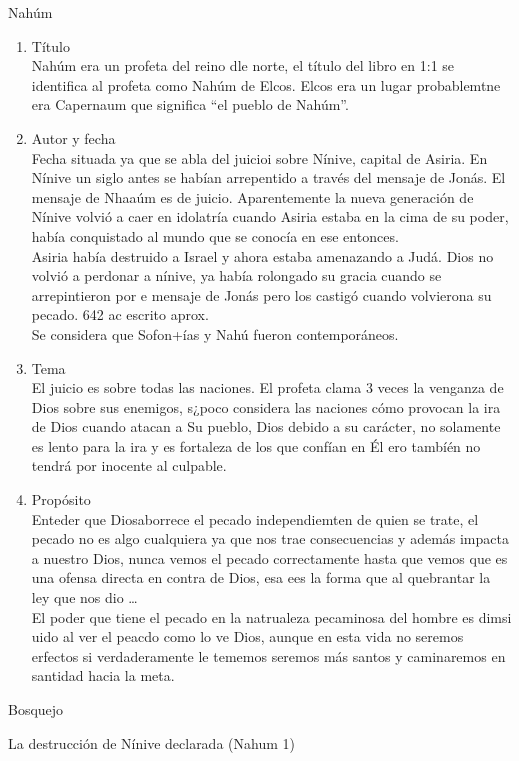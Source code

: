 \documentclass[12pt]{article}
\begin{document}
\begin{section}{Nahúm}
	\begin{enumerate}
		\item Título\\
			Nahúm era un profeta del reino dle norte, el título del libro en 1:1 se identifica al profeta como Nahúm de Elcos. Elcos era un lugar probablemtne era Capernaum que significa ``el pueblo de Nahúm''.
		\item Autor y fecha\\
			Fecha situada ya que se abla del juicioi sobre Nínive, capital de Asiria. En Nínive un siglo antes se habían arrepentido a través del mensaje de Jonás. El mensaje de Nhaaúm es de juicio. Aparentemente la nueva generación de Nínive volvió a caer en idolatría cuando Asiria estaba en la cima de su poder, había conquistado al mundo que se conocía en ese entonces.\\
			Asiria había destruido a Israel y ahora estaba amenazando a Judá. Dios no volvió a perdonar a nínive, ya había rolongado su gracia cuando se arrepintieron por e  mensaje de Jonás pero los castigó cuando volvierona  su pecado. 642 ac escrito aprox.\\
			Se considera que Sofon+ías y Nahú fueron contemporáneos.
		\item Tema\\ 
			El juicio es sobre todas las naciones. El profeta clama 3 veces la venganza de Dios sobre sus enemigos, s¿poco considera las naciones cómo provocan la ira de Dios cuando atacan a Su pueblo, Dios debido a su carácter, no solamente es lento para la ira y es fortaleza de los que confían en Él ero tambíén no tendrá por inocente al culpable. 
		\item Propósito\\
			Enteder que Diosaborrece el pecado independiemten de quien se trate, el pecado no es algo cualquiera ya que nos trae consecuencias y además impacta a nuestro Dios, nunca vemos el pecado correctamente hasta que vemos que es una ofensa directa en contra de Dios, esa ees la forma que al quebrantar la ley que nos dio \ldots \\
			El poder que tiene el pecado en la natrualeza pecaminosa del hombre es dimsi uido al ver el peacdo como lo ve Dios, aunque en esta vida no seremos erfectos si verdaderamente le tememos seremos más santos y caminaremos en santidad hacia la meta.
	\end{enumerate}
	\begin{subsection}{Bosquejo}
		\begin{subsubsection}{La destrucción de Nínive declarada (Nahum 1)}

\end{subsubsection}
\end{subsection}
\end{section}
\end{document}
